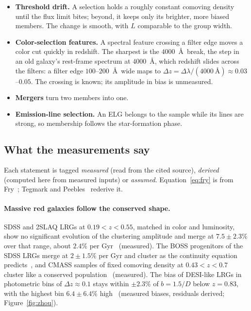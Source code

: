 \begin{itemize}
  \item \textbf{Threshold drift.}  A selection holds a roughly constant
    comoving density until the flux limit bites; beyond, it keeps only
    its brighter, more biased members.  The change is smooth, with $L$
    comparable to the group width.
  \item \textbf{Color-selection features.}  A spectral feature crossing
    a filter edge moves a color cut quickly in redshift.  The sharpest
    is the $4000$~\AA\ break, the step in an old galaxy's rest-frame
    spectrum at $4000$~\AA, which redshift slides across the filters: a
    filter edge $100$--$200$~\AA\ wide maps to
    $\Delta z = \Delta\lambda/(4000~\text{\AA}) \approx 0.03$--$0.05$.  The crossing is known; its
    amplitude in bias is unmeasured.
  \item \textbf{Mergers} turn two members into one.
  \item \textbf{Emission-line selection.}  An ELG belongs to the sample
    while its lines are strong, so membership follows the
    star-formation phase.
\end{itemize}

\subsection{What the measurements say}
\label{sec:evidence}

Each statement is tagged \emph{measured} (read from the cited source),
\emph{derived} (computed here from measured inputs) or \emph{assumed}.
Equation~\eqref{eq:fry} is from Fry~\cite{Fry1996};
Tegmark and Peebles~\cite{TegmarkPeebles1998} rederive it.

\paragraph{Massive red galaxies follow the conserved shape.}
SDSS and 2SLAQ LRGs at $0.19 < z < 0.55$, matched in color and
luminosity, show no significant evolution of the clustering amplitude
and merge at $7.5 \pm 2.3\%$ over that range, about $2.4\%$ per
Gyr~\cite{Wake2008} (measured).  The BOSS progenitors of the SDSS LRGs
merge at $2 \pm 1.5\%$ per Gyr and cluster as the continuity equation
predicts~\cite{Tojeiro2012}, and CMASS samples of fixed comoving
density at $0.43 < z < 0.7$ cluster like a conserved
population~\cite{Guo2013} (measured).  The bias of DESI-like LRGs in
photometric bins of $\Delta z \approx 0.1$ stays within $\pm 2.3\%$ of
$b = 1.5/D$ below $z = 0.83$, with the highest bin $6.4 \pm 6.4\%$
high~\cite{Zhou2021} (measured biases, residuals derived;
Figure~\ref{fig:zhou}).

